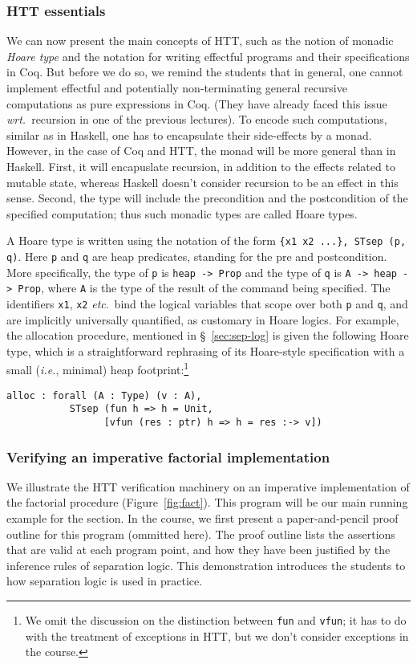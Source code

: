 \documentclass[blockstyle,preprint]{sigplanconf}
\newcommand{\code}[1]{\lstinline{#1}}
\newcommand{\etc}{\emph{etc}}
\newcommand{\ie}{\emph{i.e.}\xspace}
\newcommand{\wrt}{\emph{wrt.}\xspace}
\begin{document}
\subsubsection{HTT essentials}
\label{sec:htt-essentials}
We can now present the main concepts of HTT, such as the notion of
monadic \emph{Hoare type} and the notation for writing effectful
programs and their specifications in Coq.
%
But before we do so, we remind the students that in general, one
cannot implement effectful and potentially non-terminating general
recursive computations as pure expressions in Coq. (They have already
faced this issue \wrt~recursion in one of the previous lectures). To
encode such computations, similar as in Haskell, one has to
encapsulate their side-effects by a monad. However, in the case of Coq
and HTT, the monad will be more general than in Haskell. First, it
will encapuslate recursion, in addition to the effects related to
mutable state, whereas Haskell doesn't consider recursion to be an
effect in this sense. Second, the type will include the precondition
and the postcondition of the specified computation; thus such monadic
types are called Hoare types.

A Hoare type is written using the notation of the form
\texttt{\small\{x1 x2 ...\}, STsep (p, q)}. Here \code{p} and \code{q}
are heap predicates, standing for the pre and postcondition. More
specifically, the type of \code{p} is \code{heap -> Prop} and the type
of \code{q} is \code{A -> heap -> Prop}, where \code{A} is the type of
the result of the command being specified. The identifiers \code{x1},
\code{x2} \etc.~bind the logical variables that scope over both
\code{p} and \code{q}, and are implicitly universally quantified, as
customary in Hoare logics. For example, the allocation procedure,
mentioned in \S~\ref{sec:sep-log} is given the following Hoare type,
which is a straightforward rephrasing of its Hoare-style specification
with a small (\ie, minimal) heap footprint:\footnote{We omit the
  discussion on the distinction between \code{fun} and \code{vfun}; it
  has to do with the treatment of exceptions in HTT, but we don't
  consider exceptions in the course.}


\begin{lstlisting}
alloc : forall (A : Type) (v : A),
           STsep (fun h => h = Unit,
                 [vfun (res : ptr) h => h = res :-> v])
\end{lstlisting}
%

\subsubsection{Verifying an imperative factorial implementation}
\label{sec:verify-an-imper}
We illustrate the HTT verification machinery on an imperative
implementation of the factorial procedure
(Figure~\ref{fig:fact}). This program will be our main running example
for the section. In the course, we first present a paper-and-pencil
proof outline for this program (ommitted here). The proof outline
lists the assertions that are valid at each program point, and how
they have been justified by the inference rules of separation
logic. This demonstration introduces the students to how separation
logic is used in practice.
\end{document}
